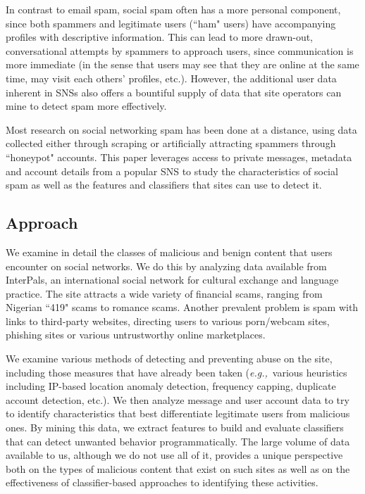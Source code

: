 \documentclass[preprint]{acm_proc_article-sp}
\newcommand{\eg}{{\em e.g.,}~}
\begin{document}
In contrast to email spam, social spam often has a more personal component, since both spammers 
and legitimate users (``ham" users) have accompanying profiles with descriptive information. This can 
lead to more drawn-out, conversational attempts by spammers to approach users, since communication 
is more immediate (in the sense that users may see that they are online at the same time, may 
visit each others' profiles, etc.). However, the additional user data inherent in SNSs also 
offers a bountiful supply of data that site operators can mine to detect spam more effectively.

Most research on social networking spam has been done at a distance, using data collected 
either through scraping or artificially attracting spammers through ``honeypot" accounts. This 
paper leverages access to private messages, metadata and account details from a popular SNS 
to study the characteristics of social spam as well as the features and classifiers that 
sites can use to detect it.

\subsection{Approach}

We examine in detail the classes of malicious and benign
content that users encounter on social networks. We do this by analyzing
data available from InterPals, an international social network
for cultural exchange and language practice. The site
attracts a wide variety of financial scams, ranging from Nigerian
``419" scams to romance scams. Another prevalent problem is spam with
links to third-party websites, directing users to various porn/webcam
sites, phishing sites or various untrustworthy online marketplaces.

We examine various methods of detecting and preventing abuse
on the site, including those measures that have already been taken
(\eg various heuristics including IP-based location anomaly detection,
frequency capping, duplicate account detection, etc.). We then analyze 
message and user account data to try to identify characteristics that 
best differentiate legitimate users from malicious ones. By mining this data, 
 we extract features to build and evaluate classifiers that can detect unwanted behavior 
programmatically. The large volume of data available to us, although we do 
not use all of it, provides a unique perspective both on the types of
malicious content that exist on such sites as well as on the
effectiveness of classifier-based approaches to identifying
these activities.
\end{document}
